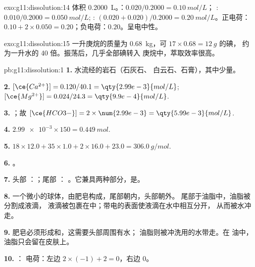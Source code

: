 \begin{solution}{exo:g11:dissolution:14}
体积 \qty{0.2000}{L}。：$0.020 / 0.2000 = \qty{0.10}{mol/L}$；
: $0.010 / 0.2000 = \qty{0.050}{mol/L}$; :
$(0.020 + 0.020) / 0.2000 = \qty{0.20}{mol/L}$。正电荷：
$0.10 + 2 \times 0.050 = 0.20$；负电荷：$0.20$。呈电中性。
\end{solution}

\begin{solution}{exo:g11:dissolution:15}
一升庚烷的质量为 \qty{0.68}{kg}，可
$17 \times 0.68 = \qty{12}{g}$ 的碘，
约为一升水的 40 倍。振荡后，几乎全部碘转入
庚烷中，萃取效率很高。
\end{solution}

\begin{solution}{pb:g11:dissolution:1}
\textbf{1.} 水流经的岩石（石灰石、
白云石、石膏），其中少量。

\textbf{2.} $[\ce{Ca^{2+}}] = 0.120 / 40.1 = \qty{2.99e-3}{mol/L}$;
$[\ce{Mg^{2+}}] = 0.024 / 24.3 = \qty{9.9e-4}{mol/L}$.

\textbf{3.} ；故
$[\ce{HCO3-}] = 2 \times \num{2.99e-3} = \qty{5.99e-3}{mol/L}$.

\textbf{4.} $\num{2.99e-3} \times 150 = \qty{0.449}{mol}$.

\textbf{5.} $18 \times 12.0 + 35 \times 1.0 + 2 \times 16.0 + 23.0 =
\qty{306.0}{g/mol}$.

\textbf{6.} 。

\textbf{7.} 头部 ：；尾部 ：
。它兼具两种部分，是。

\textbf{8.} 一个微小的球体，由肥皂构成，尾部朝内，头部朝外。
尾部于油脂中，油脂被分割成液滴，
液滴被包裹在中；带电的表面使液滴在水中相互分开，
从而被水冲走。

\textbf{9.} 肥皂必须形成和，这需要头部周围有水；
油脂则被冲洗用的水带走。在
油中，油脂只会留在皮肤上。

\textbf{10.} ：
电荷：左边 $2 \times (-1) + 2 = 0$，右边 $0$。


\end{solution}
